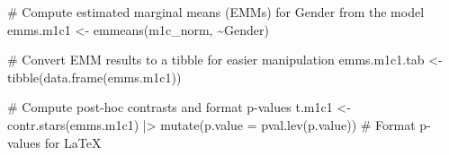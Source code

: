 \documentclass[
  bookmarksnumbered]{article}
\newenvironment{Shaded}{\begin{snugshade}}{\end{snugshade}}
\newcommand{\AttributeTok}[1]{\textcolor[rgb]{0.80,0.80,0.80}{#1}}
\newcommand{\CommentTok}[1]{\textcolor[rgb]{0.50,0.62,0.50}{#1}}
\newcommand{\FunctionTok}[1]{\textcolor[rgb]{0.94,0.94,0.56}{#1}}
\newcommand{\NormalTok}[1]{\textcolor[rgb]{0.80,0.80,0.80}{#1}}
\newcommand{\OtherTok}[1]{\textcolor[rgb]{0.94,0.94,0.56}{#1}}
\newcommand{\SpecialCharTok}[1]{\textcolor[rgb]{0.86,0.64,0.64}{#1}}
\begin{document}
\begin{Shaded}
\begin{Highlighting}[]
\CommentTok{\# Compute estimated marginal means (EMMs) for Gender from the model}
\NormalTok{emms.m1c1 }\OtherTok{\textless{}{-}} \FunctionTok{emmeans}\NormalTok{(m1c\_norm, }\SpecialCharTok{\textasciitilde{}}\NormalTok{Gender)}

\CommentTok{\# Convert EMM results to a tibble for easier manipulation}
\NormalTok{emms.m1c1.tab }\OtherTok{\textless{}{-}} \FunctionTok{tibble}\NormalTok{(}\FunctionTok{data.frame}\NormalTok{(emms.m1c1))}

\CommentTok{\# Compute post{-}hoc contrasts and format p{-}values}
\NormalTok{t.m1c1 }\OtherTok{\textless{}{-}} \FunctionTok{contr.stars}\NormalTok{(emms.m1c1) }\SpecialCharTok{|\textgreater{}}
  \FunctionTok{mutate}\NormalTok{(}\AttributeTok{p.value =} \FunctionTok{pval.lev}\NormalTok{(p.value)) }\CommentTok{\# Format p{-}values for LaTeX}


\end{Highlighting}
\end{Shaded}
\end{document}
